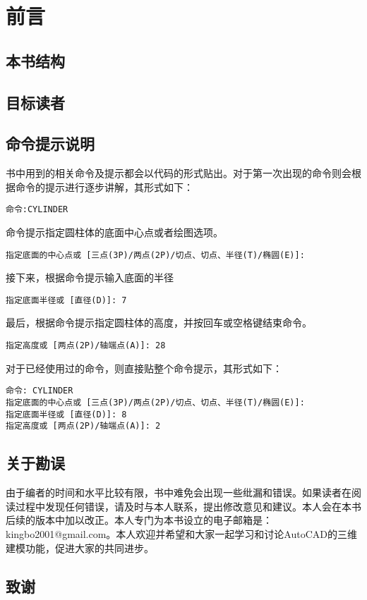 \chapter*{前言}
\section*{本书结构}
\section*{目标读者}
\section*{命令提示说明}
书中用到的相关命令及提示都会以代码的形式贴出。对于第一次出现的命令则会根据命令的提示进行逐步讲解，其形式如下：
\begin{lstlisting}
命令:CYLINDER
\end{lstlisting}

命令提示指定圆柱体的底面中心点或者绘图选项。
\begin{lstlisting}
指定底面的中心点或 [三点(3P)/两点(2P)/切点、切点、半径(T)/椭圆(E)]:
\end{lstlisting}

接下来，根据命令提示输入底面的半径
\begin{lstlisting}
指定底面半径或 [直径(D)]: 7
\end{lstlisting}

最后，根据命令提示指定圆柱体的高度，并按回车或空格键结束命令。
\begin{lstlisting}
指定高度或 [两点(2P)/轴端点(A)]: 28
\end{lstlisting}

对于已经使用过的命令，则直接贴整个命令提示，其形式如下：

\begin{lstlisting}
命令: CYLINDER
指定底面的中心点或 [三点(3P)/两点(2P)/切点、切点、半径(T)/椭圆(E)]:
指定底面半径或 [直径(D)]: 8
指定高度或 [两点(2P)/轴端点(A)]: 2
\end{lstlisting}
\section*{关于勘误}
由于编者的时间和水平比较有限，书中难免会出现一些纰漏和错误。如果读者在阅读过程中发现任何错误，请及时与本人联系，提出修改意见和建议。本人会在本书后续的版本中加以改正。本人专门为本书设立的电子邮箱是：kingbo2001@gmail.com。本人欢迎并希望和大家一起学习和讨论AutoCAD的三维建模功能，促进大家的共同进步。
\section*{致谢}
\endinput